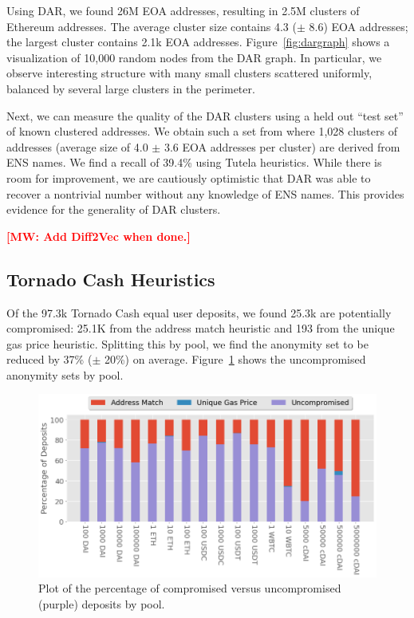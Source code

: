 \documentclass[11pt,a4paper]{article}
\newcommand{\mike}[1]{\textcolor{red}{\bf [MW: #1]}}
\begin{document}
Using DAR, we found 26M EOA addresses, resulting in 2.5M clusters of Ethereum addresses. The average cluster size contains 4.3 ($\pm$ 8.6) EOA addresses; the largest cluster contains 2.1k EOA addresses. Figure~\ref{fig:dargraph} shows a visualization of 10,000 random nodes from the DAR graph. In particular, we observe interesting structure with many small clusters scattered uniformly, balanced by several large clusters in the perimeter.

Next, we can measure the quality of the DAR clusters using a held out ``test set'' of known clustered addresses. We obtain such a set from \cite{beres2021blockchain} where 1,028 clusters of addresses (average size of 4.0 $\pm$ 3.6 EOA addresses per cluster) are derived from ENS names. We find a recall of 39.4\% using Tutela heuristics. While there is room for improvement, we are cautiously optimistic that DAR was able to recover a nontrivial number without any knowledge of ENS names. This provides evidence for the generality of DAR clusters.

\mike{Add Diff2Vec when done.}

\subsection{Tornado Cash Heuristics}

Of the 97.3k Tornado Cash equal user deposits, we found 25.3k are potentially compromised: 25.1K from the address match heuristic and 193 from the unique gas price heuristic. Splitting this by pool, we find the anonymity set to be reduced by 37\% ($\pm$ 20\%) on average. Figure~\ref{fig:tcashgraph} shows the uncompromised anonymity sets by pool.
\begin{figure}[h!]
\includegraphics[width=\linewidth]{figures/tornado_graph.png}
\caption{Plot of the percentage of compromised versus uncompromised (purple) deposits by pool. }
\label{fig:tcashgraph}
\end{figure}
\end{document}
